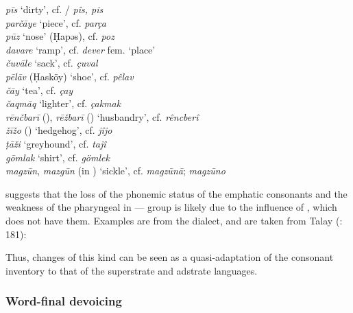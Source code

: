\documentclass[output=paper]{langsci/langscibook}
\begin{document}
\ea
\noindent \textit{p\={i}s} `dirty', cf. / \textit{p\^{i}s, pis}\\
\textit{par\v{c}\={a}ye} `piece', cf.  \textit{par\c{c}a}\\
\textit{p\={u}z} `nose' (\d{H}apəs), cf.  \textit{poz}\\
\textit{davare} `ramp', cf.  \textit{dever} fem. `place'\\
\textit{\v{c}uv\={a}le} `sack', cf.  \textit{\c{c}uval} \\
\textit{pēlāv} (\d{H}ask\"{o}y) `shoe', cf.  \textit{p\^{e}lav}\\
\textit{\v{c}\={a}y} `tea', cf.  \textit{\c{c}ay}\\
\textit{\v{c}aqm\={a}q} `lighter', cf.  \textit{\c{c}akmak}\\
\textit{rēnčbarī} (), \textit{rē\v{z}barī} () `husbandry', cf.  \textit{rêncberî}\\
\textit{žīžo} () `hedgehog', cf.  \textit{jîjo} \\
\textit{ṭāži} `greyhound', cf.  \textit{tajî} \\
\textit{g\={o}mlak} `shirt', cf.  \textit{g\"{o}mlek}\\
\textit{magz\={u}n}, \textit{mazg\={u}n} (in ) `sickle', cf.  \textit{magz\={u}n\={a}};  \textit{magz\={u}no}\\
\z

\cite{Talay2007} suggests that the loss of the phonemic status of the {emphatic consonants} and the weakness of the {pharyngeal} in ---- group is likely due to the influence of , which does not have them. Examples are from the  dialect, and are taken from Talay (\citeyear{Talay2007}: 181):


Thus, changes of this kind can be seen as a quasi-adaptation of the consonant inventory to that of the {superstrate} and {adstrate} languages.

\subsubsection{Word-final devoicing}
\end{document}
